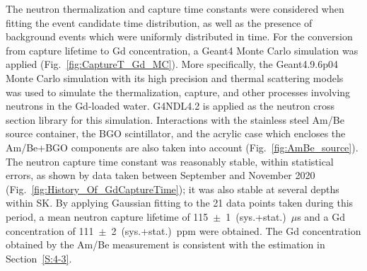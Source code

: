 \documentclass[preprint,12pt]{elsarticle}
\begin{document}
The neutron thermalization and capture time constants were considered when fitting the event candidate time distribution, as well as the presence of background events which were uniformly distributed in time.
For the conversion from capture lifetime to Gd concentration, a Geant4 Monte Carlo simulation 
was applied (Fig.~\ref{fig:CaptureT_Gd_MC}).
More specifically, the Geant4.9.6p04 Monte Carlo simulation with
its high precision and thermal scattering models was used to simulate the thermalization, capture, and other processes involving neutrons in the Gd-loaded water.
G4NDL4.2 is applied as the neutron cross section library for this simulation.
Interactions with the stainless steel Am/Be source container, the BGO scintillator, and the acrylic case which encloses the Am/Be+BGO components are also taken into account (Fig.~\ref{fig:AmBe_source}).
The neutron capture time constant was reasonably stable,   within statistical errors, as shown by data taken between  September and November 2020 (Fig.~\ref{fig:History_Of_GdCaptureTime}); it was also stable at several depths within SK. 
By applying Gaussian fitting to the 21 data points taken during this period, a mean neutron capture lifetime of 115~$\pm$~1~(sys.+stat.)~$\mu$s and a Gd concentration of 111~$\pm$~2~(sys.+stat.)~ppm were obtained.
The Gd concentration obtained by the Am/Be measurement is consistent with the estimation in Section~\ref{S:4-3}.
\end{document}
